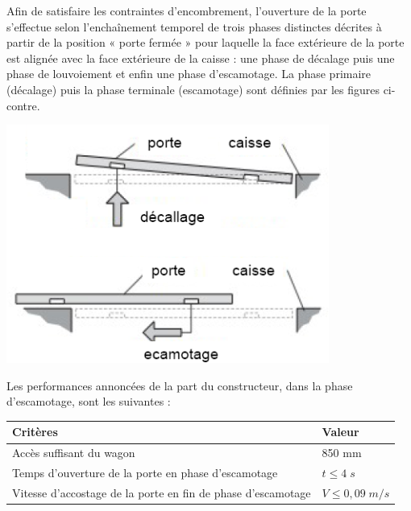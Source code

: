 \documentclass[10pt]{article}
\begin{document}
\begin{minipage}[c]{.6\linewidth}
Afin de satisfaire les contraintes d'encombrement, l'ouverture de la porte s'effectue selon l'enchaînement temporel de trois phases distinctes décrites à partir de la position « porte fermée » pour laquelle la face extérieure de la porte est alignée avec la face extérieure de la caisse : une phase de décalage puis une phase de louvoiement et enfin une phase d'escamotage. La phase primaire (décalage) puis la phase terminale (escamotage) sont définies par les figures ci-contre. 

\end{minipage} \hfill
\begin{minipage}[c]{.35\linewidth}
\begin{center}
\includegraphics[width=\textwidth]{images/fig_03}
\end{center}
\end{minipage}

Les performances annoncées de la part du constructeur, dans la phase d'escamotage, sont les suivantes :
\begin{center}
\begin{tabular}{|l|l|}
\hline
Critères & Valeur \\
\hline
\hline
Accès suffisant du wagon & 850 mm \\
\hline
Temps d'ouverture de la porte en phase d'escamotage & $t\leq 4\; s$ \\
\hline
Vitesse d’accostage de la porte en fin de phase d’escamotage & $V\leq 0,09 \; m/s$ \\
\hline
\end{tabular}
\end{center}
\end{document}
